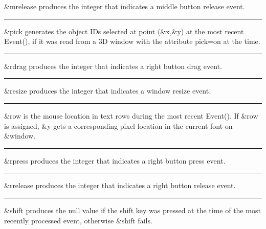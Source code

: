 \noindent
\textsf{\&mrelease} produces the integer that indicates a middle button
release event.

\bigskip\hrule\vspace{0.1cm}

\noindent
\textsf{\&pick} generates the object IDs selected at point
(\textsf{\&x},\textsf{\&y}) at the most recent \textsf{Event()}, if it
was read from a 3D window with the attribute \textsf{pick=on} at the
time.

\bigskip\hrule\vspace{0.1cm}

\noindent
\textsf{\&rdrag} produces the integer that indicates a right button drag
event.

\bigskip\hrule\vspace{0.1cm}

\noindent
\textsf{\&resize} produces the integer that indicates a window resize
event.

\bigskip\hrule\vspace{0.1cm}

\noindent
\textsf{\&row} is the mouse location in text rows during the most recent
\textsf{Event()}. If \textsf{\&row} is assigned, \textsf{\&y} gets a
corresponding pixel location in the current font on \textsf{\&window}.

\bigskip\hrule\vspace{0.1cm}

\noindent
\textsf{\&rpress} produces the integer that indicates a right button
press event.

\bigskip\hrule\vspace{0.1cm}

\noindent
\textsf{\&rrelease} produces the integer that indicates a right button
release event.

\bigskip\hrule\vspace{0.1cm}

\noindent
\textsf{\&shift} produces the null value if the shift key was pressed at
the time of the most recently processed event, otherwise
\textsf{\&shift} fails.

